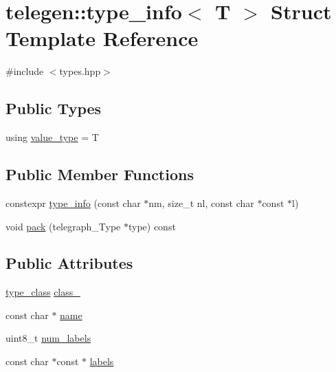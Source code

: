 \hypertarget{structtelegen_1_1type__info}{}\section{telegen\+:\+:type\+\_\+info$<$ T $>$ Struct Template Reference}
\label{structtelegen_1_1type__info}


{\ttfamily \#include $<$types.\+hpp$>$}

\subsection*{Public Types}
\begin{DoxyCompactItemize}
\item 
using \hyperlink{structtelegen_1_1type__info_a9d062952fc241b6fd91df2b038995eaf}{value\+\_\+type} = T
\end{DoxyCompactItemize}
\subsection*{Public Member Functions}
\begin{DoxyCompactItemize}
\item 
constexpr \hyperlink{structtelegen_1_1type__info_a2f67a3b15149ac1a6a95354725f9d72a}{type\+\_\+info} (const char $\ast$nm, size\+\_\+t nl, const char $\ast$const $\ast$l)
\item 
void \hyperlink{structtelegen_1_1type__info_a5ed3d1c30970a84b6507c30890d74f86}{pack} (telegraph\+\_\+\+Type $\ast$type) const
\end{DoxyCompactItemize}
\subsection*{Public Attributes}
\begin{DoxyCompactItemize}
\item 
\hyperlink{namespacetelegen_a72d4e69f0be1731e1a851a96dec858d8}{type\+\_\+class} \hyperlink{structtelegen_1_1type__info_a7b45b05aeac67bd7700d3b140455f77f}{class\+\_\+}
\item 
const char $\ast$ \hyperlink{structtelegen_1_1type__info_ad2de0d0c01346808ffb8f86dfb4a3a0e}{name}
\item 
uint8\+\_\+t \hyperlink{structtelegen_1_1type__info_aada1921511a38c6889fe0d89701ce125}{num\+\_\+labels}
\item 
const char $\ast$const  $\ast$ \hyperlink{structtelegen_1_1type__info_a57e2f47e182fd9099f09ac086fd88be8}{labels}
\end{DoxyCompactItemize}


